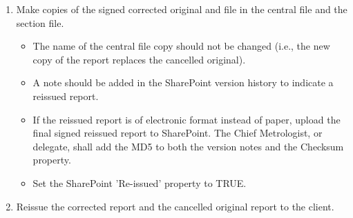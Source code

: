 \begin{enumerate}
\item Make copies of the signed corrected original and file in the central file and the section file. 
\begin{itemize}
\item The name of the central file copy should not be changed (i.e., the new copy of the report replaces the cancelled original). 
\item A note should be added in the SharePoint version history to indicate a reissued report.
\item If the reissued report is of electronic format instead of paper, upload the final signed reissued report to SharePoint. The Chief Metrologist, or delegate, shall add the MD5 to both the version notes and the Checksum property.
\item Set the SharePoint 'Re-issued' property to TRUE.
\end{itemize}
\item Reissue the corrected report and the cancelled original report to the client.
\end{enumerate}

